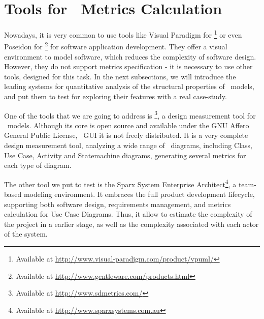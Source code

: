\section{Tools for \uml\ Metrics Calculation} \label{tools}

Nowadays, it is very common to use tools like \textsf{Visual Paradigm for \uml\footnote{Available at \url{http://www.visual-paradigm.com/product/vpuml/}}} or even \textsf{Poseidon for \uml}\footnote{Available at \url{http://www.gentleware.com/products.html}} for software application development.
They offer a visual environment to model software, which reduces the complexity of software design.
However, they do not support metrics specification - it is necessary to use other tools, designed for this task.
In the next subsections, we will introduce the leading systems for quantitative analysis of the structural properties of \uml\ models, and put them to test for exploring their features with a real case-study.

One of the tools that we are going to address is \sdmetrics\footnote{Available at \url{http://www.sdmetrics.com/}}, a design measurement tool for \uml\ models.
Although its core is open source and available under the GNU Affero General Public License, \sdmetrics\ GUI it is not freely distributed. 
It is a very complete design measurement tool, analyzing a wide range of \uml\ diagrams, including Class, Use Case, Activity and Statemachine diagrams, generating several metrics for each type of diagram.

The other tool we put to test is the \textsf{Sparx System Enterprise Architect}{\footnote{Available at \url{http://www.sparxsystems.com.au}}}, a team-based modeling environment. 
It embraces the full product development lifecycle, supporting both software design, requirements management, and metrics calculation for Use Case Diagrams.
Thus, it allow to estimate the complexity of the project in a earlier stage, as well as the complexity associated with each actor of the system.
